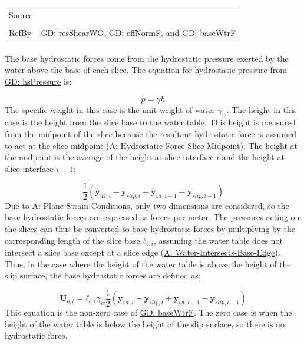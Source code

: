 \documentclass[12pt]{article}
\begin{document}
\begin{minipage}{\textwidth}
\begin{tabular}{>{\raggedright}p{}>{\raggedright\arraybackslash}p{}}
\\ \midrule \\
Source & \cite{fredlund1977}
         
\\ \midrule \\
RefBy & \hyperref[GD:resShearWO]{GD: resShearWO}, \hyperref[GD:effNormF]{GD: effNormF}, and \hyperref[GD:baseWtrF]{GD: baseWtrF}
        
\\ \bottomrule
\end{tabular}
\end{minipage}
\paragraph{}
\label{GD:baseWtrFDeriv}
The base hydrostatic forces come from the hydrostatic pressure exerted by the water above the base of each slice. The equation for hydrostatic pressure from \hyperref[GD:hsPressure]{GD: hsPressure} is:

\begin{displaymath}
p=γ h
\end{displaymath}
The specific weight in this case is the unit weight of water ${γ_{w}}$. The height in this case is the height from the slice base to the water table. This height is measured from the midpoint of the slice because the resultant hydrostatic force is assumed to act at the slice midpoint (\hyperref[assumpHFSM]{A: Hydrostatic-Force-Slice-Midpoint}). The height at the midpoint is the average of the height at slice interface $i$ and the height at slice interface $i-1$:

\begin{displaymath}
\frac{1}{2} \left({\mathbf{y}_{wt,i}}-{\mathbf{y}_{slip,i}}+{\mathbf{y}_{wt,i-1}}-{\mathbf{y}_{slip,i-1}}\right)
\end{displaymath}
Due to \hyperref[assumpPSC]{A: Plane-Strain-Conditions}, only two dimensions are considered, so the base hydrostatic forces are expressed as forces per meter. The pressures acting on the slices can thus be converted to base hydrostatic forces by multiplying by the corresponding length of the slice base ${\mathbf{ℓ}_{b,i}}$, assuming the water table does not intersect a slice base except at a slice edge (\hyperref[assumpWIBE]{A: Water-Intersects-Base-Edge}). Thus, in the case where the height of the water table is above the height of the slip surface, the base hydrostatic forces are defined as:

\begin{displaymath}
{\mathbf{U}_{b,i}}={\mathbf{ℓ}_{b,i}} {γ_{w}} \frac{1}{2} \left({\mathbf{y}_{wt,i}}-{\mathbf{y}_{slip,i}}+{\mathbf{y}_{wt,i-1}}-{\mathbf{y}_{slip,i-1}}\right)
\end{displaymath}
This equation is the non-zero case of \hyperref[GD:baseWtrF]{GD: baseWtrF}. The zero case is when the height of the water table is below the height of the slip surface, so there is no hydrostatic force.
\end{document}
